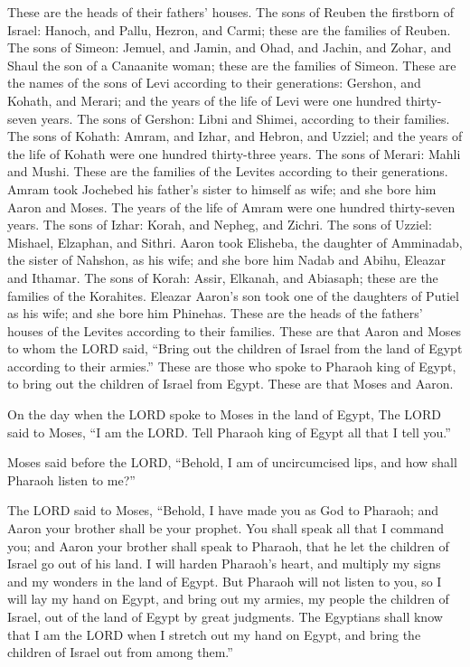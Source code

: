 \myverse{}These are the heads of their fathers’ houses. The sons of Reuben the firstborn of Israel: Hanoch, and Pallu, Hezron, and Carmi; these are the families of Reuben. \myverse{}The sons of Simeon: Jemuel, and Jamin, and Ohad, and Jachin, and Zohar, and Shaul the son of a Canaanite woman; these are the families of Simeon. \myverse{}These are the names of the sons of Levi according to their generations: Gershon, and Kohath, and Merari; and the years of the life of Levi were one hundred thirty-seven years. \myverse{}The sons of Gershon: Libni and Shimei, according to their families. \myverse{}The sons of Kohath: Amram, and Izhar, and Hebron, and Uzziel; and the years of the life of Kohath were one hundred thirty-three years. \myverse{}The sons of Merari: Mahli and Mushi. These are the families of the Levites according to their generations. \myverse{}Amram took Jochebed his father’s sister to himself as wife; and she bore him Aaron and Moses. The years of the life of Amram were one hundred thirty-seven years. \myverse{}The sons of Izhar: Korah, and Nepheg, and Zichri. \myverse{}The sons of Uzziel: Mishael, Elzaphan, and Sithri. \myverse{}Aaron took Elisheba, the daughter of Amminadab, the sister of Nahshon, as his wife; and she bore him Nadab and Abihu, Eleazar and Ithamar. \myverse{}The sons of Korah: Assir, Elkanah, and Abiasaph; these are the families of the Korahites. \myverse{}Eleazar Aaron’s son took one of the daughters of Putiel as his wife; and she bore him Phinehas. These are the heads of the fathers’ houses of the Levites according to their families. \myverse{}These are that Aaron and Moses to whom the LORD said, “Bring out the children of Israel from the land of Egypt according to their armies.” \myverse{}These are those who spoke to Pharaoh king of Egypt, to bring out the children of Israel from Egypt. These are that Moses and Aaron.


\myverse{}On the day when the LORD spoke to Moses in the land of Egypt, \myverse{}The LORD said to Moses, “I am the LORD. Tell Pharaoh king of Egypt all that I tell you.”


\myverse{}Moses said before the LORD, “Behold, I am of uncircumcised lips,
and how shall Pharaoh listen to me?”


\mychapter{} \myverse*{}The LORD said to Moses, “Behold, I have made you as God to Pharaoh; and Aaron your brother shall be your prophet. \myverse{}You shall speak all that I command you; and Aaron your brother shall speak to Pharaoh, that he let the children of Israel go out of his land. \myverse{}I will harden Pharaoh’s heart, and multiply my signs and my wonders in the land of Egypt. \myverse{}But Pharaoh will not listen to you, so I will lay my hand on Egypt, and bring out my armies, my people the children of Israel, out of the land of Egypt by great judgments. \myverse{}The Egyptians shall know that I am the LORD when I stretch out my hand on Egypt, and bring the children of Israel out from among them.”


